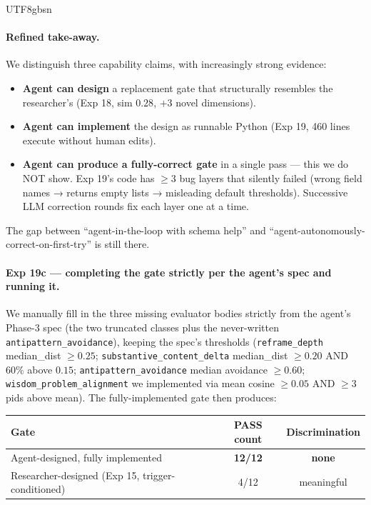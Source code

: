 \documentclass{article}
\begin{document}
\begin{CJK*}{UTF8}{gbsn}
\paragraph{Refined take-away.} We distinguish three capability
claims, with increasingly strong evidence:
\begin{itemize}[leftmargin=*, topsep=2pt, itemsep=1pt]
  \item \textbf{Agent can design} a replacement gate that
    structurally resembles the researcher's (Exp 18, sim \(0.28\),
    \(+3\) novel dimensions).
  \item \textbf{Agent can implement} the design as runnable
    Python (Exp 19, 460 lines execute without human edits).
  \item \textbf{Agent can produce a fully-correct gate} in a
    single pass — this we do NOT show. Exp 19's code has
    \(\geq 3\) bug layers that silently failed (wrong field
    names → returns empty lists → misleading default
    thresholds). Successive LLM correction rounds fix each
    layer one at a time.
\end{itemize}
The gap between ``agent-in-the-loop with schema help'' and
``agent-autonomously-correct-on-first-try'' is still there.

\paragraph{Exp 19c — completing the gate strictly per the
agent's spec and running it.}
We manually fill in the three missing evaluator bodies strictly
from the agent's Phase-3 spec (the two truncated classes plus
the never-written \texttt{antipattern\_avoidance}), keeping the
spec's thresholds (\texttt{reframe\_depth} median\_dist $\geq
0.25$; \texttt{substantive\_content\_delta} median\_dist $\geq
0.20$ AND $60\%$ above $0.15$; \texttt{antipattern\_avoidance}
median avoidance $\geq 0.60$; \texttt{wisdom\_problem\_alignment}
we implemented via mean cosine $\geq 0.05$ AND $\geq 3$ pids
above mean). The fully-implemented gate then produces:

\begin{center}\small
\begin{tabular}{l c c}
  \toprule
  Gate & PASS count & Discrimination \\
  \midrule
  Agent-designed, fully implemented & \textbf{12/12} & \textbf{none} \\
  Researcher-designed (Exp 15, trigger-conditioned) & 4/12 & meaningful \\
  \bottomrule
\end{tabular}
\end{center}


\end{CJK*}
\end{document}
